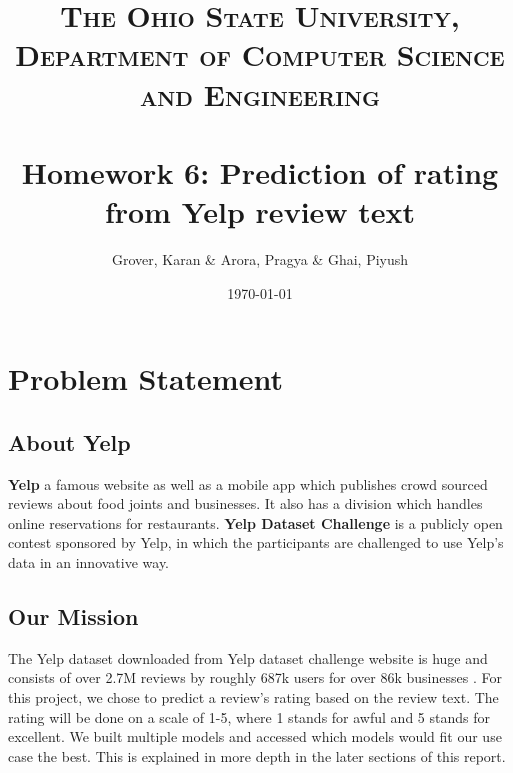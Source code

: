 \documentclass[paper=a4, fontsize=11pt]{scrartcl} %
\title{	
\normalfont \normalsize 
\textsc{The Ohio State University, Department of Computer Science and Engineering} \\ [25pt] %
\horrule{0.5pt} \\[0.4cm] %
\huge Homework 6: Prediction of rating from Yelp review text %
\horrule{2pt} \\[0.5cm] %
}
\author{Grover, Karan \& Arora, Pragya \& Ghai, Piyush}
\affil{\textit {\{grover.120, arora.170, ghai.8\}@osu.edu}}
\date{\normalsize\today} %
\numberwithin{equation}{section} %
\numberwithin{figure}{section} %
\numberwithin{table}{section} %
\begin{document}
\maketitle %
\newpage
\section{Problem Statement}
\subsection{About Yelp}
\textbf{Yelp} \cite{yelp} a famous website as well as a mobile app which publishes crowd sourced reviews about food joints and businesses. It also has a division which handles online reservations for restaurants. \textbf{Yelp Dataset Challenge}\cite{yelp_dataset_challenge} is a publicly open contest sponsored by Yelp, in which the participants are challenged to use Yelp's data in an innovative way. \\
\subsection{Our Mission}
The Yelp dataset downloaded from Yelp dataset challenge website is huge and consists of over 2.7M reviews by roughly 687k users for over 86k businesses \cite{yelp_dataset_challenge}. For this project, we chose to predict a review's rating based on the review text. The rating will be done on a scale of 1-5, where 1 stands for awful and 5 stands for excellent. We built multiple models and accessed which models would fit our use case the best. This is explained in more depth in the later sections of this report.
\end{document}
